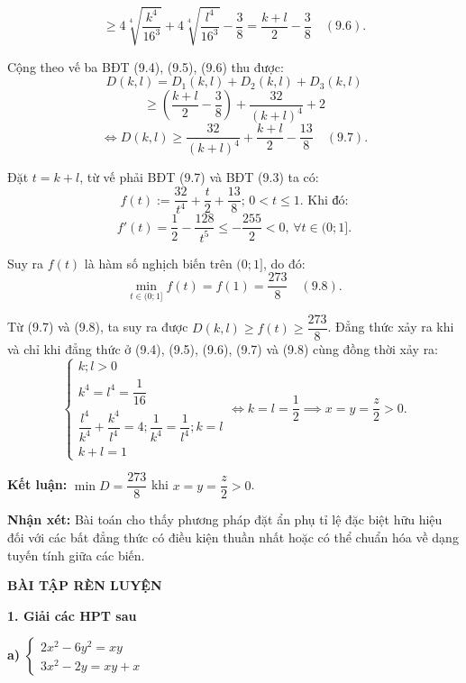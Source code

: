 \documentclass[12pt]{report}
\begin{document}
\[
\geq 4\sqrt[4]{\dfrac{k^4}{16^3}} + 4\sqrt[4]{\dfrac{l^4}{16^3}} - \dfrac{3}{8} = \dfrac{k + l}{2} - \dfrac{3}{8} \quad (9.6).
\]

\noindent Cộng theo vế ba BĐT (9.4), (9.5), (9.6) thu được:
\[
D(k,l) = D_1(k,l) + D_2(k,l) + D_3(k,l)
\]
\[
\geq \left(\dfrac{k + l}{2} - \dfrac{3}{8}\right) + \dfrac{32}{(k + l)^4} + 2
\]
\[
\Leftrightarrow D(k,l) \geq \dfrac{32}{(k + l)^4} + \dfrac{k + l}{2} - \dfrac{13}{8} \quad (9.7).
\]

\noindent Đặt $t = k + l$, từ vế phải BĐT (9.7) và BĐT (9.3) ta có:
\[
f(t) := \dfrac{32}{t^4} + \dfrac{t}{2} + \dfrac{13}{8}; \, 0 < t \leq 1. \text{ Khi đó:}
\]
\[
f'(t) = \dfrac{1}{2} - \dfrac{128}{t^5} \leq -\dfrac{255}{2} < 0, \, \forall t \in (0; 1].
\]

\noindent Suy ra $f(t)$ là hàm số nghịch biến trên $(0; 1]$, do đó:
\[
\min_{t \in (0; 1]} f(t) = f(1) = \dfrac{273}{8} \quad (9.8).
\]

\noindent Từ (9.7) và (9.8), ta suy ra được $D(k,l) \geq f(t) \geq \dfrac{273}{8}$. Đẳng thức xảy ra khi và chỉ khi đẳng thức ở (9.4), (9.5), (9.6), (9.7) và (9.8) cùng đồng thời xảy ra:
\[
\begin{cases}
k; l > 0 \\
k^4 = l^4 = \dfrac{1}{16} \\[8pt]
\dfrac{l^4}{k^4} + \dfrac{k^4}{l^4} = 4; \dfrac{1}{k^4} = \dfrac{1}{l^4}; k = l \\[8pt]
k + l = 1
\end{cases}
\Leftrightarrow k = l = \dfrac{1}{2} \implies x = y = \dfrac{z}{2} > 0.
\]

\noindent \textbf{Kết luận:} $\min D = \dfrac{273}{8}$ khi $x = y = \dfrac{z}{2} > 0$.

\vspace{0.3cm}
\noindent \textbf{Nhận xét:} Bài toán cho thấy phương pháp đặt ẩn phụ tỉ lệ đặc biệt hữu hiệu đối với các bất đẳng thức có điều kiện thuần nhất hoặc có thể chuẩn hóa về dạng tuyến tính giữa các biến.
\newpage
\begin{center}
    \textbf{BÀI TẬP RÈN LUYỆN}
\end{center}

\vspace{0.3cm}
\noindent \textbf{1. Giải các HPT sau}

\vspace{0.2cm}
\noindent \textbf{a)} $\begin{cases} 2x^2 - 6y^2 = xy \\ 3x^2 - 2y = xy + x \end{cases}$
\end{document}

